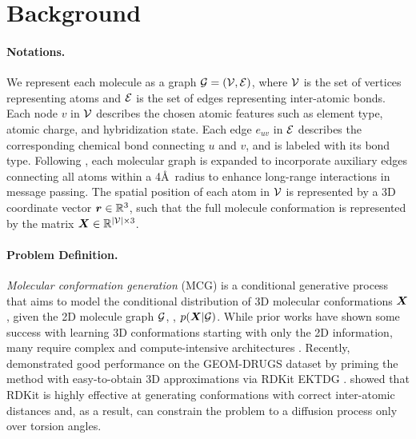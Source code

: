 \section{Background}
\label{section:background}
\vspace{-1ex}
\paragraph{Notations.} We represent each molecule as a graph ${\mathcal{G}} =  ({\mathcal{V}}, {\mathcal{E}})$, where ${\mathcal{V}}$ is the set of vertices representing atoms and ${\mathcal{E}}$ is the set of edges representing inter-atomic bonds. Each node $v$ in ${\mathcal{V}}$ describes the chosen atomic features such as element type, atomic charge, and hybridization state. Each edge $e_{uv}$ in ${\mathcal{E}}$ describes the corresponding chemical bond connecting $u$ and $v$, and is labeled with its bond type. Following \citet{GraphDG}, each molecular graph is expanded to incorporate auxiliary edges connecting all atoms within a 4\AA\ radius to enhance long-range interactions in message passing.
The spatial position of each atom in ${\mathcal{V}}$ is represented by a 3D coordinate vector ${\bm{r}} \in {\mathbb{R}}^{3}$, such that the full molecule conformation is represented by the matrix ${\bm{X}} \in {\mathbb{R}}^{|{\mathcal{V}}| \times 3}$. 

\vspace{-1ex}
\paragraph{Problem Definition.} \emph{Molecular conformation generation} (MCG) is a conditional generative process that aims to model the conditional distribution of 3D molecular conformations ${\bm{X}}$, given the 2D molecule graph ${\mathcal{G}}$, \ie, $p({\bm{X}} | {\mathcal{G}})$. While prior works have shown some success with learning 3D conformations starting with only the 2D information, many require complex and compute-intensive architectures \citep{DMCG, unimol}. Recently, \citet{torsional-diffusion} demonstrated good performance on the GEOM-DRUGS dataset by priming the method with easy-to-obtain 3D approximations via RDKit EKTDG \citep{rdkit}. \citet{torsional-diffusion} showed that RDKit is highly effective at generating conformations with correct inter-atomic distances and, as a result, can constrain the problem to a diffusion process only over torsion angles.

